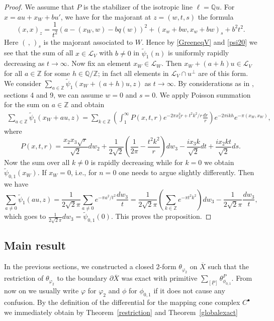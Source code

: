 \documentclass[12pt,leqno]{amsart}
\numberwithin{equation}{section}
\theoremstyle{plain}
\theoremstyle{definition}
\theoremstyle{remark}
\newcommand{\Q}{\mathbb{Q}}
\newcommand{\Z}{\mathbb{Z}}
\newcommand{\calL}{\mathcal{L}}
\begin{document}
\begin{proof}
We assume that $P$ is the stabilizer of the isotropic line $\ell=\Q u$. For $x = au + x_W + bu'$, we have for the majorant at $z=(w,t,s)$ the formula
\[
(x,x)_z = \frac1{t^2}(a-(x_W,w)-bq(w))^2 + (x_w+bw,x_w+bw)_s +b^2t^2.
\]
Here $(\,,\,)_s$ is the majorant associated to $W$. Hence by \eqref{GreeneqV} and \eqref{psi20} we see that the sum of all $x \in \calL_V$ with $b \ne 0$ in $\tilde{\psi}_1(n)$ is uniformly rapidly decreasing as $t \to \infty$. Now fix an element $x_W \in \calL_W$. Then  $x_W +(a+h)u \in \calL_V$ for all $a \in \Z$ for some $h \in \Q/\Z$; in fact all elements in $\calL_V \cap u^{\perp}$ are of this form. We consider $\sum_{a \in \Z} \tilde{\psi}_1(x_W +(a+h)u,z)$ as $t \to \infty$. By considerations as in \cite{FMres}, sections 4 and 9, we can assume $w=0$ and $s=0$. We apply Poisson summation for the sum on $a \in \Z$ and obtain
\begin{align*}
\sum_{a \in \Z} \tilde{\psi}_1(x_W +au,z) = \sum_{k \in \Z} \left( \int_{1}^{\infty} P(x,t,r) e^{-2\pi x_3^2r +t^2k^2/r} \frac{dr}{r} \right) e^{-2\pi i k h} e^{-\pi (x_W,x_W)},
\end{align*}
where
\[
P(x,t,r) = \frac{x_2x_3\sqrt{r}}{\sqrt{2}} dw_2 + \frac{1}{2\sqrt{2}}\left(\frac1{2\pi}-\frac{t^2k^2}{r}\right)dw_3 - \frac{i x_3 k}{\sqrt{2}}dt +  \frac{i x_2kt}{\sqrt{2}} ds.\]
Now the sum over all $k \ne 0$ is rapidly decreasing while for $k=0$ we obtain $\tilde{\psi}_{0,1}(x_W)$. If $x_W=0$, i.e., for $n=0$ one needs to argue slightly differently. Then we have
\[
\sum_{a \ne 0} \tilde{\psi}_1(au,z) = \frac{1}{2\sqrt{2}\pi} \sum_{a \ne 0} e^{-\pi a^2/t^2} \frac{dw_3}{t} =  \frac{1}{2\sqrt{2}\pi} \left(\sum_{k \in \Z} e^{-\pi t^2k^2} \right) dw_3 -  \frac{1}{2\sqrt{2}\pi} \frac{dw_3}{t},
\]
which goes to $ \tfrac{1}{2\sqrt{2}\pi} dw_3 = \tilde{\psi}_{0,1}(0)$. 
This proves the proposition.
\end{proof}




\subsection{Main result}

In the previous sections, we constructed a closed $2$-form $\theta_{\varphi_2}$ on $\overline{X}$ such
that the restriction of $\theta_{\varphi_2}$ to the boundary $\partial \overline{X}$ was exact with
primitive $ \sum_{[\underline{P}]} \theta^P_{\phi_{0,1}}$. From now on we usually write $\varphi$ for $\varphi_2$ and $\phi$ for $\phi_{0,1}$ if it does not cause any confusion. By the definition of the differential for the mapping cone complex $C^{\bullet}$ we immediately obtain by Theorem~\ref{restriction} and Theorem~\ref{globalexact}
\end{document}
